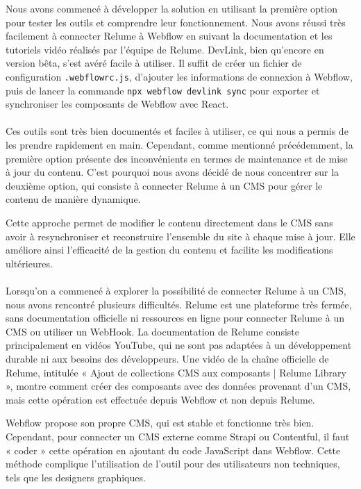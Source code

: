 Nous avons commencé à développer la solution en utilisant la première option pour tester les outils et comprendre leur fonctionnement. Nous avons réussi très facilement à connecter Relume à Webflow en suivant la documentation et les tutoriels vidéo réalisés par l'équipe de Relume. DevLink, bien qu'encore en version bêta, s'est avéré facile à utiliser. Il suffit de créer un fichier de configuration \texttt{.webflowrc.js}, d'ajouter les informations de connexion à Webflow, puis de lancer la commande \texttt{npx webflow devlink sync} pour exporter et synchroniser les composants de Webflow avec React.
\\ \\
Ces outils sont très bien documentés et faciles à utiliser, ce qui nous a permis de les prendre rapidement en main. Cependant, comme mentionné précédemment, la première option présente des inconvénients en termes de maintenance et de mise à jour du contenu. C'est pourquoi nous avons décidé de nous concentrer sur la deuxième option, qui consiste à connecter Relume à un CMS pour gérer le contenu de manière dynamique.

Cette approche permet de modifier le contenu directement dans le CMS sans avoir à resynchroniser et reconstruire l'ensemble du site à chaque mise à jour. Elle améliore ainsi l'efficacité de la gestion du contenu et facilite les modifications ultérieures.
\\ \\ 
Lorsqu'on a commencé à explorer la possibilité de connecter Relume à un CMS, nous avons rencontré plusieurs difficultés. Relume est une plateforme très fermée, sans documentation officielle ni ressources en ligne pour connecter Relume à un CMS ou utiliser un WebHook. La documentation de Relume consiste principalement en vidéos YouTube, qui ne sont pas adaptées à un développement durable ni aux besoins des développeurs. Une vidéo de la chaîne officielle de Relume, intitulée « Ajout de collections CMS aux composants | Relume Library », montre comment créer des composants avec des données provenant d'un CMS, mais cette opération est effectuée depuis Webflow et non depuis Relume.

Webflow propose son propre CMS, qui est stable et fonctionne très bien. Cependant, pour connecter un CMS externe comme Strapi ou Contentful, il faut « coder » cette opération en ajoutant du code JavaScript dans Webflow. Cette méthode complique l'utilisation de l'outil pour des utilisateurs non techniques, tels que les designers graphiques.

